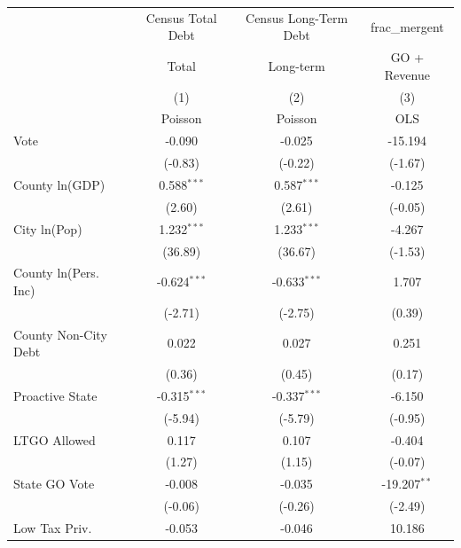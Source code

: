 \begingroup
\centering
\begin{tabular*}{\textwidth}{@{\extracolsep{\fill}}lccc}
   \toprule
                        & Census Total Debt & Census Long-Term Debt & frac\_mergent\\   
                        & Total             & Long-term             & GO + Revenue \\   
                        & (1)               & (2)                   & (3)\\  
                        &  Poisson          & Poisson               & OLS\\  
   \midrule 
   Vote                 & -0.090            & -0.025                & -15.194\\   
                        & (-0.83)          & (-0.22)              & (-1.67)\\   
   County ln(GDP)       & 0.588$^{***}$     & 0.587$^{***}$         & -0.125\\   
                        & (2.60)           & (2.61)               & (-0.05)\\   
   City ln(Pop)         & 1.232$^{***}$     & 1.233$^{***}$         & -4.267\\   
                        & (36.89)          & (36.67)              & (-1.53)\\   
   County ln(Pers. Inc) & -0.624$^{***}$    & -0.633$^{***}$        & 1.707\\   
                        & (-2.71)          & (-2.75)              & (0.39)\\   
   County Non-City Debt & 0.022             & 0.027                 & 0.251\\   
                        & (0.36)           & (0.45)               & (0.17)\\   
   Proactive State      & -0.315$^{***}$    & -0.337$^{***}$        & -6.150\\   
                        & (-5.94)          & (-5.79)              & (-0.95)\\   
   LTGO Allowed         & 0.117             & 0.107                 & -0.404\\   
                        & (1.27)           & (1.15)               & (-0.07)\\   
   State GO Vote        & -0.008            & -0.035                & -19.207$^{**}$\\   
                        & (-0.06)          & (-0.26)              & (-2.49)\\   
   Low Tax Priv.        & -0.053            & -0.046                & 10.186\\   

\end{tabular*}
